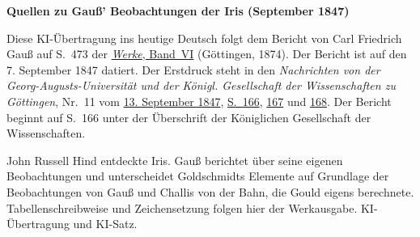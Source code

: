 \clearpage\thispagestyle{empty}
\begin{center}\textbf{Quellen zu Gauß’ Beobachtungen der Iris (September 1847)}\end{center}
\noindent Diese KI-Übertragung ins heutige Deutsch folgt dem Bericht von Carl Friedrich Gauß auf S.~473 der \href{https://gdz.sub.uni-goettingen.de/id/PPN236007467}{\textit{Werke}, Band~VI} (Göttingen, 1874). Der Bericht ist auf den 7. September 1847 datiert. Der Erstdruck steht in den \textit{Nachrichten von der Georg-Augusts-Universität und der Königl. Gesellschaft der Wissenschaften zu Göttingen}, Nr.~11 vom \href{https://images.p.sub.uni-goettingen.de/iiif/image/gdz:PPN668664029_0003:00000163/full/1800,/0/default.jpg}{13. September 1847}, \href{https://images.p.sub.uni-goettingen.de/iiif/image/gdz:PPN668664029_0003:00000168/full/1800,/0/default.jpg}{S.~166}, \href{https://images.p.sub.uni-goettingen.de/iiif/image/gdz:PPN668664029_0003:00000169/full/1800,/0/default.jpg}{167} und \href{https://images.p.sub.uni-goettingen.de/iiif/image/gdz:PPN668664029_0003:00000170/full/1800,/0/default.jpg}{168}. Der Bericht beginnt auf S.~166 unter der Überschrift der Königlichen Gesellschaft der Wissenschaften.
\par\smallskip\noindent John Russell Hind entdeckte Iris. Gauß berichtet über seine eigenen Beobachtungen und unterscheidet Goldschmidts Elemente auf Grundlage der Beobachtungen von Gauß und Challis von der Bahn, die Gould eigens berechnete. Tabellenschreibweise und Zeichensetzung folgen hier der Werkausgabe. KI-Übertragung und KI-Satz.
\clearpage
